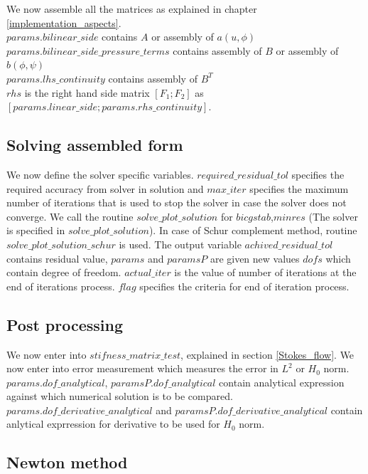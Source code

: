 \documentclass[a4paper,12pt]{book}
\begin{document}
We now assemble all the matrices as explained in chapter \ref{implementation_aspects}. \\$params.bilinear\_side$ contains $A$ or assembly of $a(u,\phi)$\\$params.bilinear\_side\_pressure\_terms$ contains assembly of $B$ or assembly of $b(\phi,\psi)$\\ $params.lhs\_continuity$ contains assembly of $B^T$\\ $rhs$ is the right hand side matrix $[F_1;F_2]$ as\\ $[params.linear\_side;params.rhs\_continuity]$. \\

\subsection{Solving assembled form}

We now define the solver specific variables. $required\_residual\_tol$ specifies the required accuracy from solver in solution and $max\_iter$ specifies the maximum number of iterations that is used to stop the solver in case the solver does not converge. We call the routine $solve\_plot\_solution$ for $bicgstab$,$minres$ (The solver is specified in $solve\_plot\_solution$). In case of Schur complement method, routine $solve\_plot\_solution\_schur$ is used. The output variable $achived\_residual\_tol$ contains residual value, $params$ and $paramsP$ are given new values $dofs$ which contain degree of freedom. $actual\_iter$ is the value of number of iterations at the end of iterations process. $flag$ specifies the criteria for end of iteration process.\\

\subsection{Post processing}

We now enter into $stifness\_matrix\_test$, explained in section \ref{Stokes_flow}. We now enter into error measurement which measures the error in $L^2$ or $H_0$ norm. $params.dof\_analytical$, $paramsP.dof\_analytical$ contain analytical expression against which numerical solution is to be compared. $params.dof\_derivative\_analytical$ and  $paramsP.dof\_derivative\_analytical$ contain anlytical exprression for derivative to be used for $H_0$ norm.\\

\subsection{Newton method}
\end{document}
